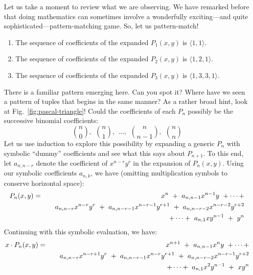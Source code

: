 Let us take a moment to review what we are observing.  We have remarked before that doing mathematics can sometimes involve a wonderfully exciting---and quite sophisticated---pattern-matching game.  So, let us pattern-match!
\begin{enumerate}
\item
The sequence of coefficients of the expanded $P_1(x,y)$ is $\langle 1,1 \rangle$.
\item
The sequence of coefficients of the expanded $P_2(x,y)$ is $\langle 1,2,1 \rangle$.
\item
The sequence of coefficients of the expanded $P_3(x,y)$ is $\langle 1,3,3,1 \rangle$.
\end{enumerate}
There is a familiar pattern emerging here.  Can you spot it?  Where have we seen a pattern of tuples that begins in the same manner?  As a rather broad hint, look at Fig.~\ref{fig:pascal-triangle}!  Could the coefficients of each $P_n$ possibly be the successive binomial coefficients:
\[ {n \choose 0}, \ \ {n \choose 1}, \ \ \ldots, \ \ {n \choose
  {n-1}}, \ \ {n \choose n}
\]
Let us use induction to explore this possibility by expanding a generic $P_n$ with symbolic ``dummy'' coefficients and see what this says about $P_{n+1}$.  To this end, let $a_{n,n-r}$ denote the coefficient of $x^{n-r} y^r$ in the expansion of $P_n(x,y)$.  Using our symbolic coefficients $a_{n,k}$, we have (omitting multiplication symbols to conserve horizontal space):
\begin{eqnarray*}
P_n(x,y) & = &
 x^n \ + \ a_{n,n-1} x^{n-1} y \ + \cdots + \\
         &   & \hspace*{.15in}
a_{n,n-r} x^{n-r} y^r \ + \ a_{n,n-r-1} x^{n-r-1} y^{r+1}
\ + \ a_{n,n-r-2} x^{n-r-2} y^{r+2} \\
         &   & \hspace*{.15in}
+ \cdots + \ a_{n,1} x y^{n-1} \ + \ y^n
\end{eqnarray*}
Continuing with this symbolic evaluation, we have:
\begin{eqnarray}
\nonumber
x \cdot P_n(x,y) & = &
 x^{n+1} \ + \ a_{n,n-1} x^n y \ + \cdots + \\
\nonumber
         &   & \hspace*{.15in}
a_{n,n-r} x^{n-r+1} y^r \ + \ a_{n,n-r-1} x^{n-r} y^{r+1}
\ + \ a_{n,n-r-2} x^{n-r-1} y^{r+2} \\
\label{eq:xPk}
         &   & \hspace*{.15in}
+ \cdots + \ a_{n,1} x^2 y^{n-1} \ + \ x y^n
\end{eqnarray}
